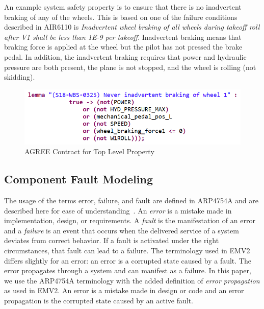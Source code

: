 An example system safety property is to ensure that there is no inadvertent braking of any of the wheels. This is based on one of the failure conditions described in AIR6110 is \textit{Inadvertent wheel braking of all wheels during takeoff roll after V1 shall be less than 1E-9 per takeoff}. 
Inadvertent braking means that braking force is applied at the wheel but the pilot has not pressed the brake pedal.  In addition, the inadvertent braking requires that power and hydraulic pressure are both present, the plane is not stopped, and the wheel is rolling (not skidding). 
\begin{figure}[h!]
	\vspace{-0.2in}
	\begin{center}
	\includegraphics[width=.8\textwidth]{images/inadvertent_braking.png}
	\end{center}
	\vspace{-0.3in}
	\caption{AGREE Contract for Top Level Property}
	\label{fig:inadvertent_braking}
	\vspace{-0.2in}
\end{figure}


\subsection{Component Fault Modeling}

The usage of the terms error, failure, and fault are defined in ARP4754A and are described here for ease of understanding~\cite{SAE:ARP4754A}. An \textit{error} is a mistake made in implementation, design, or requirements. A \textit{fault} is the manifestation of an error and a \textit{failure} is an event that occurs when the delivered service of a system deviates from correct behavior. If a fault is activated under the right circumstances, that fault can lead to a failure. The terminology used in EMV2 differs slightly for an error: an error is a corrupted state caused by a fault. The error propagates through a system and can  manifest as a failure. In this paper, we use the ARP4754A terminology with the added definition of \textit{error propagation} as used in EMV2. An error is a mistake made in design or code and an error propagation is the corrupted state caused by an active fault. 

